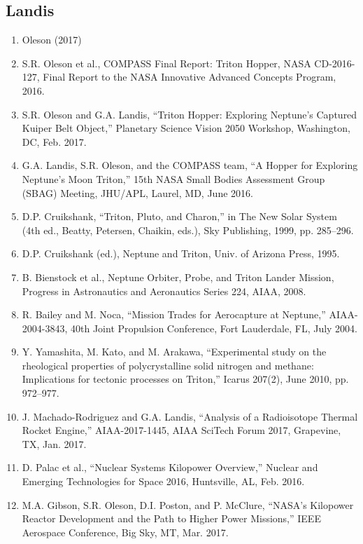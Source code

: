 \documentclass[12pt]{article}
\begin{document}
\subsection*{Landis}
\begin{enumerate}
\item Oleson (2017)
\item S.R. Oleson et al., COMPASS Final Report: Triton Hopper, NASA CD-2016-127, Final Report to the NASA Innovative Advanced Concepts Program, 2016.
\item S.R. Oleson and G.A. Landis, ``Triton Hopper: Exploring Neptune’s Captured Kuiper Belt Object,'' Planetary Science Vision 2050 Workshop, Washington, DC, Feb. 2017.
\item G.A. Landis, S.R. Oleson, and the COMPASS team, ``A Hopper for Exploring Neptune’s Moon Triton,'' 15th NASA Small Bodies Assessment Group (SBAG) Meeting, JHU/APL, Laurel, MD, June 2016.
\item D.P. Cruikshank, ``Triton, Pluto, and Charon,'' in The New Solar System (4th ed., Beatty, Petersen, Chaikin, eds.), Sky Publishing, 1999, pp. 285--296.
\item D.P. Cruikshank (ed.), Neptune and Triton, Univ. of Arizona Press, 1995.
\item B. Bienstock et al., Neptune Orbiter, Probe, and Triton Lander Mission, Progress in Astronautics and Aeronautics Series 224, AIAA, 2008.
\item R. Bailey and M. Noca, ``Mission Trades for Aerocapture at Neptune,'' AIAA-2004-3843, 40th Joint Propulsion Conference, Fort Lauderdale, FL, July 2004.
\item Y. Yamashita, M. Kato, and M. Arakawa, ``Experimental study on the rheological properties of polycrystalline solid nitrogen and methane: Implications for tectonic processes on Triton,'' Icarus 207(2), June 2010, pp. 972--977.
\item J. Machado-Rodriguez and G.A. Landis, ``Analysis of a Radioisotope Thermal Rocket Engine,'' AIAA-2017-1445, AIAA SciTech Forum 2017, Grapevine, TX, Jan. 2017.
\item D. Palac et al., ``Nuclear Systems Kilopower Overview,'' Nuclear and Emerging Technologies for Space 2016, Huntsville, AL, Feb. 2016.
\item M.A. Gibson, S.R. Oleson, D.I. Poston, and P. McClure, ``NASA’s Kilopower Reactor Development and the Path to Higher Power Missions,'' IEEE Aerospace Conference, Big Sky, MT, Mar. 2017.
\end{enumerate}
\end{document}
